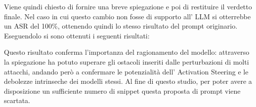 Viene quindi chiesto di fornire una breve spiegazione e poi di restituire il verdetto finale. Nel caso in cui questo cambio non fosse di supporto all' LLM si otterrebbe un ASR del 100\%, ottenendo quindi lo stesso risultato del prompt originario. 
Eseguendolo si sono ottenuti i seguenti risultati:

\begin{table}[H]
    \centering
    \vspace{0.2cm}
    \caption{Risultati dei modelli con prompt modificato.}
    \label{tab:risultati_attacchi_modificati}
\end{table}

Questo risultato conferma l'importanza del ragionamento del modello: attraverso la spiegazione ha potuto superare gli ostacoli inseriti dalle perturbazioni di molti attacchi, andando però a confermare le potenzialità dell' Activation Steering e le debolezze intrinseche dei modelli stessi.
Al fine di questo studio, per poter avere a disposizione un sufficiente numero di snippet questa proposta di prompt viene scartata.

